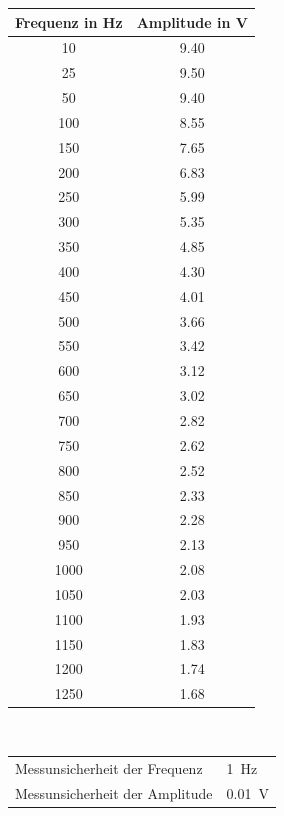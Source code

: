 \begin{figure}[h!]
	\centering
	\begin{tabular}{c|c}
		Frequenz in \si{\hertz}& Amplitude in \si{\volt} \\
		\hline
	10 & 9.40  \\
	25 & 9.50  \\
	50 & 9.40  \\
	100 & 8.55 \\
	150 & 7.65 \\
	200 & 6.83 \\
	250 & 5.99 \\
	300 & 5.35 \\
	350 & 4.85 \\
	400 & 4.30  \\
	450 & 4.01 \\
	500 & 3.66 \\
	550 & 3.42 \\
	600 & 3.12 \\
	650 & 3.02 \\
	700 & 2.82 \\
	750 & 2.62 \\
	800 & 2.52 \\
	850 & 2.33 \\
	900 & 2.28 \\
	950 & 2.13 \\
	1000 & 2.08 \\
	1050 & 2.03 \\
	1100 & 1.93 \\
	1150 & 1.83 \\
	1200 & 1.74 \\
	1250 & 1.68 \\
	\end{tabular}
	\label{tab:amplitude}
	\\
	\vspace{1cm}
	\begin{tabular}{ll}
		Messunsicherheit der Frequenz & \SI{1}{\hertz} \\
		Messunsicherheit der Amplitude & \SI{0.01}{\volt}
	\end{tabular}	
\end{figure}



\clearpage

